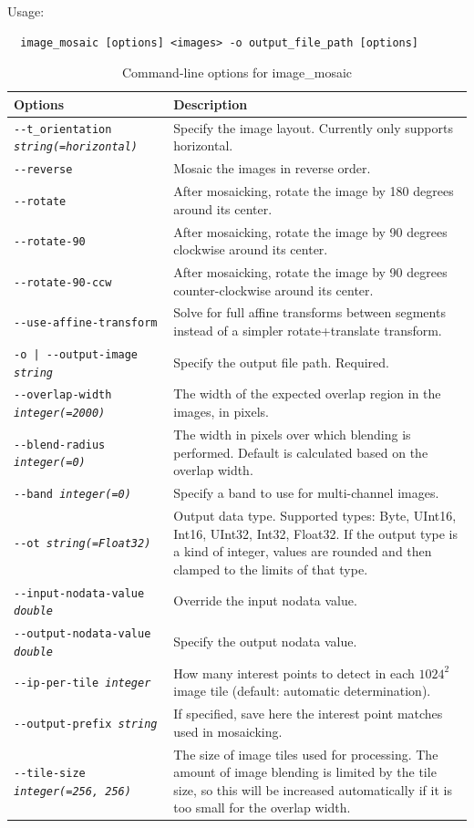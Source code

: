 Usage:
\begin{verbatim}
  image_mosaic [options] <images> -o output_file_path [options]
\end{verbatim}


\begin{longtable}{|l|p{10cm}|}
\caption{Command-line options for image\_mosaic}
\label{tbl:imagemosaic}
\endfirsthead
\endhead
\endfoot
\endlastfoot
\hline
Options & Description \\
\hline \hline
\texttt{-\/-t\_orientation \textit{string(=horizontal)} } &
Specify the image layout.  Currently only supports horizontal.
\\ \hline
\texttt{-\/-reverse} & 
Mosaic the images in reverse order.
\\ \hline
\texttt{-\/-rotate} & 
After mosaicking, rotate the image by 180 degrees around its center.
\\ \hline
\texttt{-\/-rotate-90} & 
After mosaicking, rotate the image by 90 degrees clockwise around its center.
\\ \hline
\texttt{-\/-rotate-90-ccw} & 
After mosaicking, rotate the image by 90 degrees counter-clockwise around its center.
\\ \hline
\texttt{-\/-use-affine-transform} & 
Solve for full affine transforms between segments instead of a simpler rotate+translate transform.
 \\ \hline
\texttt{-o | -\/-output-image  \textit{string} } &
Specify the output file path.  Required.
\\ \hline
\texttt{-\/-overlap-width \textit{integer(=2000)} }  &
The width of the expected overlap region in the images, in pixels.
\\ \hline
\texttt{-\/-blend-radius \textit{integer(=0)} }  &
The width in pixels over which blending is performed.  Default is calculated 
based on the overlap width.
\\ \hline
\texttt{-\/-band \textit{integer(=0)} }  &
Specify a band to use for multi-channel images.
\\ \hline
\texttt{-\/-ot  \textit{string(=Float32)} } &
Output data type. Supported types: Byte, UInt16, Int16, UInt32, Int32, Float32. If the output type is a kind of integer, values are rounded and then clamped to the limits of that type.
\\ \hline
\texttt{-\/-input-nodata-value \textit{double}  } &
Override the input nodata value.
\\ \hline
\texttt{-\/-output-nodata-value \textit{double}  } &
Specify the output nodata value.
\\ \hline
\texttt{-\/-ip-per-tile \textit{integer}} &
How many interest points to detect in each $1024^2$ image tile (default: automatic
determination).
\\ \hline
\texttt{-\/-output-prefix  \textit{string} } &
If specified, save here the interest point matches used in mosaicking.
\\ \hline
\texttt{-\/-tile-size \textit{integer(=256, 256)} } &
The size of image tiles used for processing.  The amount of image blending is limited by
the tile size, so this will be increased automatically if it is too small for the overlap width.
\\ \hline


\end{longtable}
